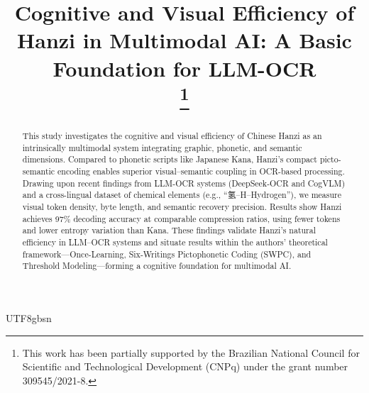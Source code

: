\documentclass[conference]{IEEEtran}
\begin{document}
\begin{CJK*}{UTF8}{gbsn}%

\title{Cognitive and Visual Efficiency of Hanzi in Multimodal AI: A Basic Foundation for LLM-OCR\\


\thanks{This work has been partially supported by the Brazilian National Council for Scientific and Technological Development (CNPq) under the grant number 309545/2021-8.
}
}

\author{
\and


{}


}

\maketitle

\begin{abstract}
This study investigates the cognitive and visual efficiency of Chinese Hanzi as an intrinsically multimodal system integrating graphic, phonetic, and semantic dimensions. Compared to phonetic scripts like Japanese Kana, Hanzi’s compact picto-semantic encoding enables superior visual–semantic coupling in OCR-based processing. Drawing upon recent findings from LLM-OCR systems (DeepSeek-OCR and CogVLM) and a cross-lingual dataset of chemical elements (e.g., ``氢–H–Hydrogen''), we measure visual token density, byte length, and semantic recovery precision. Results show Hanzi achieves 97\% decoding accuracy at comparable compression ratios, using fewer tokens and lower entropy variation than Kana. These findings validate Hanzi’s natural efficiency in LLM–OCR systems and situate results within the authors’ theoretical framework—Once-Learning, Six-Writings Pictophonetic Coding (SWPC), and Threshold Modeling—forming a cognitive foundation for multimodal AI.
\end{abstract}


\end{CJK*}
\end{document}
